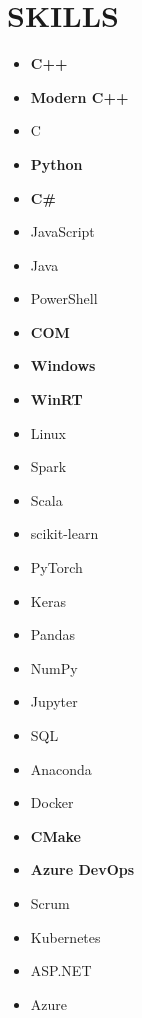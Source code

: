 \documentclass[11pt,a4paper,roman]{moderncv}
\begin{document}
\section{SKILLS}
{\begin{multicols}{4}
\begin{itemize}
  \item \textbf{C++}
  \item \textbf{Modern C++}
  \item C
  \item \textbf{Python}
  \item  \textbf{C\#}
  \item JavaScript
  \item Java
  \item PowerShell
  \item \textbf{COM}
  \item \textbf{Windows}
  \item \textbf{WinRT}
  \item Linux
  \item Spark
  \item Scala
  \item scikit-learn
  \item PyTorch
  \item Keras
  \item Pandas
  \item NumPy
  \item Jupyter
  \item SQL
  \item Anaconda
  \item Docker
  \item \textbf{CMake}
  \item \textbf{Azure DevOps}
  \item Scrum
  \item Kubernetes
  \item ASP.NET
  \item Azure
\end{itemize}
\end{multicols}
}
\end{document}
